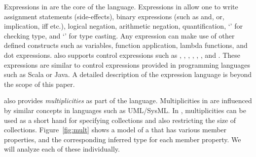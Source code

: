 Expressions in \Klang{} are the core of the language. Expressions in
\Klang{} allow one to write assignment statements (side-effects),
binary expressions (such as and, or, implication, iff etc.), logical
negation, arithmetic negation, quantification, `' for checking
type, and `' for type casting. Any expression can make use of
other defined constructs such as variables, function application,
lambda functions, and dot expressions. \Klang{} also supports control
expressions such as , , ,
, , , and . These
expressions are similar to control expressions provided in programming
languages such as Scala or Java. A detailed description of the
expression language is beyond the scope of this paper.

\Klang{} also provides {\em multiplicities} as part of the
language. Multiplicities in \Klang{} are influenced by similar
concepts in languages such as UML/SysML. In \Klang{},
multiplicities can be used as a short hand for specifying collections
and also restricting the size of collections. Figure~\ref{fig:mult}
shows a \Klang{} model of a  that has various member
properties, and the corresponding inferred type for each member
property. We will analyze each of these individually.


